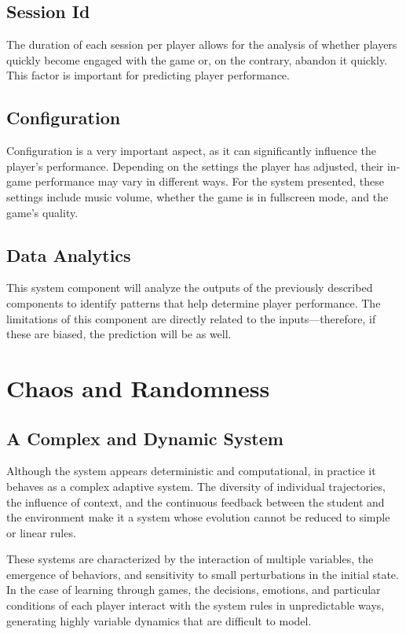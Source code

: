\documentclass{article}
\begin{document}
  \subsection*{Session Id}
  The duration of each session per player allows for the analysis of whether players quickly become engaged with the game or, on the contrary, abandon it quickly. This factor is important for predicting player performance.
  
  \subsection*{Configuration}
  Configuration is a very important aspect, as it can significantly influence the player's performance. Depending on the settings the player has adjusted, their in-game performance may vary in different ways. For the system presented, these settings include music volume, whether the game is in fullscreen mode, and the game’s quality.
  
  \subsection*{Data Analytics}
  This system component will analyze the outputs of the previously described components to identify patterns that help determine player performance. The limitations of this component are directly related to the inputs—therefore, if these are biased, the prediction will be as well.
  

  \section*{Chaos and Randomness}

  \subsection*{A Complex and Dynamic System}

Although the system appears deterministic and computational, in practice 
it behaves as a complex adaptive system. The diversity of individual 
trajectories, the influence of context, and the continuous feedback 
between the student and the environment make it a system whose evolution 
cannot be reduced to simple or linear rules.

These systems are characterized by the interaction of multiple variables, 
the emergence of behaviors, and sensitivity to small perturbations in the 
initial state. In the case of learning through games, the decisions, 
emotions, and particular conditions of each player interact with the 
system rules in unpredictable ways, generating highly variable dynamics 
that are difficult to model.
\end{document}
